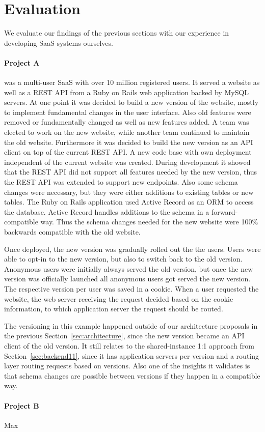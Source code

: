 
\section{Evaluation}
\label{sec:eval}

We evaluate our findings of the previous sections with our experience in developing SaaS systems ourselves.

\paragraph{Project A} was a multi-user SaaS with over 10 million registered users. It served a website as well as a REST API from a Ruby on Rails web application backed by MySQL servers. At one point it was decided to build a new version of the website, mostly to implement fundamental changes in the user interface. Also old features were removed or fundamentally changed as well as new features added. A team was elected to work on the new website, while another team continued to maintain the old website. Furthermore it was decided to build the new version as an API client on top of the current REST API. A new code base with own deployment independent of the current website was created. During development it showed that the REST API did not support all features needed by the new version, thus the REST API was extended to support new endpoints. Also some schema changes were necessary, but they were either additions to existing tables or new tables. The Ruby on Rails application used Active Record as an ORM to access the database. Active Record handles additions to the schema in a forward-compatible way. Thus the schema changes needed for the new website were 100\% backwards compatible with the old website.

Once deployed, the new version was gradually rolled out the the users. Users were able to opt-in to the new version, but also to switch back to the old version. Anonymous users were initially always served the old version, but once the new version was officially launched all anonymous users got served the new version. The respective version per user was saved in a cookie. When a user requested the website, the web server receiving the request decided based on the cookie information, to which application server the request should be routed.

The versioning in this example happened outside of our architecture proposals in the previous Section~\ref{sec:architecture}, since the new version became an API client of the old version. It still relates to the shared-instance 1:1 approach from Section~\ref{sec:backend11}, since it has application servers per version and a routing layer routing requests based on versions. Also one of the insights it validates is that schema changes are possible between versions if they happen in a compatible way.

\paragraph{Project B} Max


